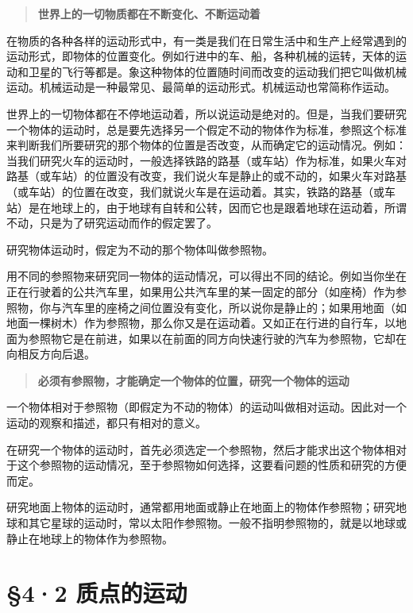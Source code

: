 \begin{quote}
\textbf{世界上的一切物质都在不断变化、不断运动着}
\end{quote}

在物质的各种各样的运动形式中，有一类是我们在日常生活中和生产上经常遇到的运动形式，即物体的位置变化。例如行进中的车、船，各种机械的运转，天体的运动和卫星的飞行等都是。象这种物体的位置随时间而改变的运动我们把它叫做机械运动。机械运动是一种最常见、最简单的运动形式。机械运动也常简称作运动。

世界上的一切物体都在不停地运动着，所以说运动是绝对的。但是，当我们要研究一个物体的运动时，总是要先选择另一个假定不动的物体作为标准，参照这个标准来判断我们所要研究的那个物体的位置是否改变，从而确定它的运动情况。例如：当我们研究火车的运动时，一般选择铁路的路基（或车站）作为标准，如果火车对路基（或车站）的位置没有改变，我们说火车是静止的或不动的，如果火车对路基（或车站）的位置在改变，我们就说火车是在运动着。其实，铁路的路基（或车站）是在地球上的，由于地球有自转和公转，因而它也是跟着地球在运动着，所谓不动，只是为了研究运动而作的假定罢了。

研究物体运动时，假定为不动的那个物体叫做参照物。

用不同的参照物来研究同一物体的运动情况，可以得出不同的结论。例如当你坐在正在行驶着的公共汽车里，如果用公共汽车里的某一固定的部分（如座椅）作为参照物，你与汽车里的座椅之间位置没有变化，所以说你是静止的；如果用地面（如地面一棵树木）作为参照物，那么你又是在运动着。又如正在行进的自行车，以地面为参照物它是在前进，如果以在前面的同方向快速行驶的汽车为参照物，它却在向相反方向后退。

\begin{quote}
\textbf{必须有参照物，才能确定一个物体的位置，研究一个物体的运动}
\end{quote}

一个物体相对于参照物（即假定为不动的物体）的运动叫做相对运动。因此对一个运动的观察和描述，都只有相对的意义。

在研究一个物体的运动时，首先必须选定一个参照物，然后才能求出这个物体相对于这个参照物的运动情况，至于参照物如何选择，这要看问题的性质和研究的方便而定。

研究地面上物体的运动时，通常都用地面或静止在地面上的物体作参照物；研究地球和其它星球的运动时，常以太阳作参照物。一般不指明参照物的，就是以地球或静止在地球上的物体作为参照物。

\section{§4·2 质点的运动}\label{ux8d28ux70b9ux7684ux8fd0ux52a8}

